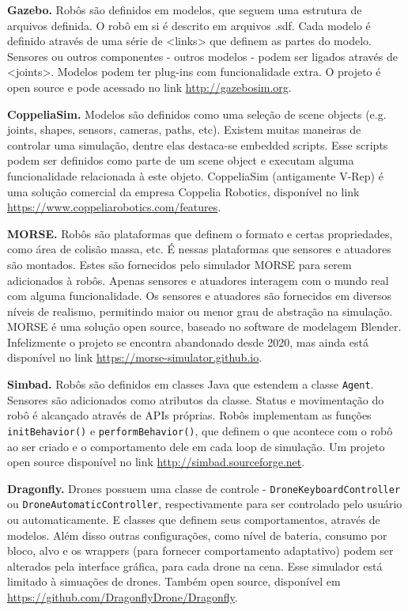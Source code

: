 \textbf{Gazebo.} Robôs são definidos em modelos, que seguem uma estrutura de arquivos definida. O robô em si é descrito em arquivos .sdf. Cada modelo é definido através de uma série de <links> que definem as partes do modelo. Sensores ou outros componentes - outros modelos - podem ser ligados através de <joints>. Modelos podem ter plug-ins com funcionalidade extra. O projeto é open source e pode acessado no link \url{http://gazebosim.org}. 

\textbf{CoppeliaSim.} Modelos são definidos como uma seleção de scene objects (e.g. joints, shapes, sensors, cameras, paths, etc). Existem muitas maneiras de controlar uma simulação, dentre elas destaca-se embedded scripts. Esse scripts podem ser definidos como parte de um scene object e executam alguma funcionalidade relacionada à este objeto. CoppeliaSim (antigamente V-Rep) é uma solução comercial da empresa Coppelia Robotics, disponível no link \url{https://www.coppeliarobotics.com/features}.

\textbf{MORSE.} Robôs são plataformas que definem o formato e certas propriedades, como área de colisão massa, etc. É nessas plataformas que sensores e atuadores são montados. Estes são fornecidos pelo simulador MORSE para serem adicionados à robôs. Apenas sensores e atuadores interagem com o mundo real com alguma funcionalidade. Os sensores e atuadores são fornecidos em diversos níveis de realismo, permitindo maior ou menor grau de abstração na simulação. MORSE é uma solução open source, baseado no software de modelagem Blender. Infelizmente o projeto se encontra abandonado desde 2020, mas ainda está disponível no link \url{https://morse-simulator.github.io}.

\textbf{Simbad.} Robôs são definidos em classes Java que estendem a classe \texttt{Agent}. Sensores são adicionados como atributos da classe. Status e movimentação do robô é alcançado através de APIs próprias. Robôs implementam as funções \texttt{initBehavior()} e \texttt{performBehavior()}, que definem o que acontece com o robô ao ser criado e o comportamento dele em cada loop de simulação. Um projeto open source disponível no link \url{http://simbad.sourceforge.net}.

\textbf{Dragonfly.} Drones possuem uma classe de controle - \texttt{DroneKeyboardController} ou \texttt{DroneAutomaticController}, respectivamente para ser controlado pelo usuário ou automaticamente. E classes que definem seus comportamentos, através de modelos. Além disso outras configurações, como nível de bateria, consumo por bloco, alvo e os wrappers (para fornecer comportamento adaptativo)  podem ser alterados pela interface gráfica, para cada drone na cena. Esse simulador está limitado à simuações de drones. Também open source, disponível em \url{https://github.com/DragonflyDrone/Dragonfly}.

